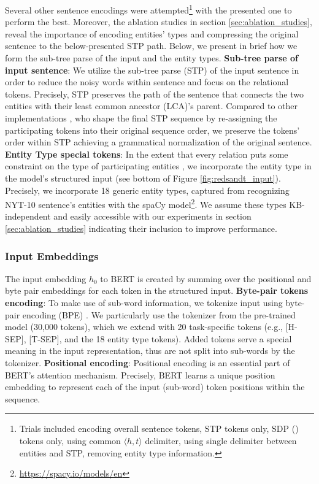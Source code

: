 \documentclass[11pt,a4paper]{article}
\begin{document}
Several other sentence encodings were attempted\footnote{Trials included encoding overall sentence tokens, STP tokens only, SDP (\cite{Xu2015}) tokens only, using common $\langle h, t \rangle$ delimiter, using single delimiter between entities and STP, removing entity type information.} with the presented one to perform the best. Moreover, the ablation studies in section \ref{sec:ablation_studies}, reveal the importance of encoding entities' types and compressing the original sentence to the below-presented STP path.
Below, we present in brief how we form the sub-tree parse of the input and the entity types. 
\newline
\textbf{Sub-tree parse of input sentence}:
We utilize the sub-tree parse (STP) of the input sentence in order to reduce the noisy words within sentence and focus on the relational tokens. Precisely, STP preserves the path of the sentence that connects the two entities with their least common ancestor (LCA)'s parent. Compared to other implementations \cite{Liu2018}, who shape the final STP sequence by re-assigning the participating tokens into their original sequence order, we preserve the tokens' order within STP achieving a grammatical normalization of the original sentence.
\newline
\textbf{Entity Type special tokens}:
In the extent that every relation puts some constraint on the type of participating entities \cite{Liu2014,Vashishth2018}, we incorporate the entity type in the model's structured input (see bottom of Figure \ref{fig:redsandt_input}). 
\newline
Precisely, we incorporate 18 generic entity types, captured from recognizing NYT-10 sentence’s entities with the spaCy model\footnote{\href{https://spacy.io/models/en}{https://spacy.io/models/en}}. We assume these types KB-independent and easily accessible with our experiments in section \ref{sec:ablation_studies} indicating their inclusion to improve performance.



\subsubsection{Input Embeddings}
The input embedding $h_0$ to BERT is created by summing over the positional and byte pair embeddings for each token in the structured input. 
\newline
\textbf{Byte-pair tokens encoding}:
To make use of sub-word information, we tokenize input using byte-pair encoding (BPE) \cite{Sennrich2016}. We particularly use the tokenizer from the pre-trained model (30,000 tokens), which we extend with 20 task-specific tokens (e.g., [H-SEP], [T-SEP], and the 18 entity type tokens). Added tokens serve a special meaning in the input representation, thus are not split into sub-words by the tokenizer.
\newline
\textbf{Positional encoding}:
Positional encoding is an essential part of BERT's attention mechanism. Precisely, BERT learns a unique position embedding to represent each of the input (sub-word) token positions within the sequence.
\end{document}
